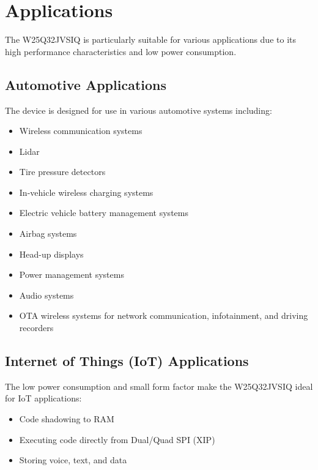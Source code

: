 \section{Applications}

The W25Q32JVSIQ is particularly suitable for various applications due to its high performance characteristics and low power consumption.

\subsection{Automotive Applications}
The device is designed for use in various automotive systems including:
\begin{itemize}
	\item Wireless communication systems
	\item Lidar
	\item Tire pressure detectors
	\item In-vehicle wireless charging systems
	\item Electric vehicle battery management systems
	\item Airbag systems
	\item Head-up displays
	\item Power management systems
	\item Audio systems
	\item OTA wireless systems for network communication, infotainment, and driving recorders \cite{Winbond:2024}
\end{itemize}

\subsection{Internet of Things (IoT) Applications}
The low power consumption and small form factor make the W25Q32JVSIQ ideal for IoT applications:
\begin{itemize}
	\item Code shadowing to RAM
	\item Executing code directly from Dual/Quad SPI (XIP)
	\item Storing voice, text, and data \cite{Jotrin:2018}
\end{itemize}


\clearpage
